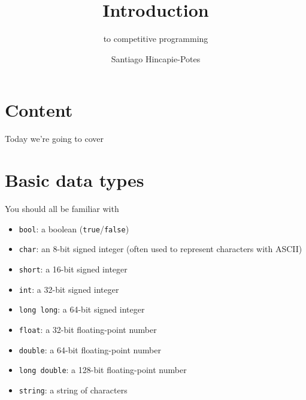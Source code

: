 \documentclass{beamer}
\title{Introduction}
\subtitle{to competitive programming}
\author{Santiago Hincapie-Potes}
\institute{Universidad EAFIT}
\date{\displaydate{date}}
\begin{document}
\maketitle

\section*{Content}
\begin{frame}{Today we're going to cover}
  \tableofcontents[hideallsubsections]
\end{frame}

\section{Basic data types}
\begin{frame}{You should all be familiar with}
  \begin{itemize}
  \item \texttt{bool}: a boolean (\texttt{true}/\texttt{false})
  \item \texttt{char}: an 8-bit signed integer (often used to represent characters with ASCII)
  \item \texttt{short}: a 16-bit signed integer
  \item \texttt{int}: a 32-bit signed integer
  \item \texttt{long long}: a 64-bit signed integer
  \item \texttt{float}: a 32-bit floating-point number
  \item \texttt{double}: a 64-bit floating-point number
  \item \texttt{long double}: a 128-bit floating-point number
  \item \texttt{string}: a string of characters
  \end{itemize}
\end{frame}
\end{document}

